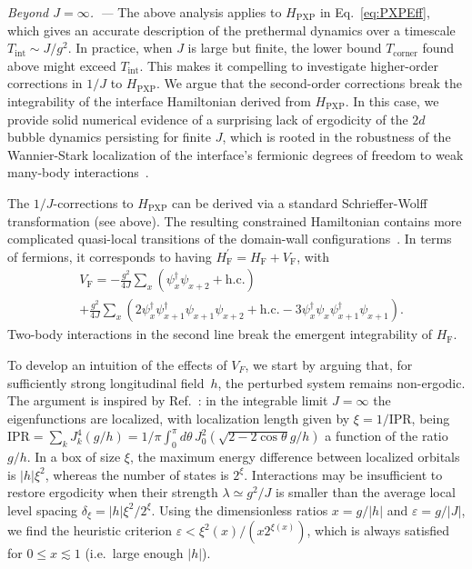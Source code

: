 \documentclass[reprint,aps,prl,superscriptaddress,english,nolongbibliography]{revtex4-2}
\begin{document}
\emph{Beyond $J=\infty$.~---} 
The above analysis applies to $H_{\mathrm{PXP}}$ in Eq.~\eqref{eq:PXPEff}, which gives an accurate description of the prethermal dynamics over a timescale $T_{\mathrm{int}}\sim J/g^2$. In practice, when $J$ is large but finite, the lower bound $T_{\text{corner}}$ found above might exceed $T_{\mathrm{int}}$. This makes it compelling to investigate higher-order corrections in $1/J$ to $H_{\mathrm{PXP}}$. We argue that the second-order corrections break the integrability of the interface Hamiltonian derived from $H_{\mathrm{PXP}}$. In this case, we provide solid numerical evidence of a surprising lack of ergodicity of the $2d$ bubble dynamics persisting for finite $J$, which is rooted in the robustness of the Wannier-Stark localization of the interface's fermionic degrees of freedom to weak many-body interactions~\cite{Refael2019From,Schulz2019Stark}.


The $1/J$-corrections to $H_{\mathrm{PXP}}$ can be derived via a standard Schrieffer-Wolff transformation (see above). The resulting constrained Hamiltonian contains more complicated quasi-local transitions of the domain-wall configurations~\cite{Balducci2022Interface}. In terms of fermions, it 
corresponds to having $H^{\prime}_{\mathrm{F}} = H_{\mathrm{F}} + V_{\mathrm{F}}$, with 
\begin{equation}
\begin{split}
    &V_{\mathrm{F}} = -\frac{g^2}{4J} \sum_x \left(\psi^\dagger_x \psi_{x+2}+ \mathrm{h.c.}\right) \\
    &+ \frac{g^2}{4J}\sum_x\left(2\psi^\dagger_x \psi^\dagger_{x+1} \psi_{x+1}\psi_{x+2}+ \mathrm{h.c.}-3\psi^\dagger_{x} \psi_{x}\psi^\dagger_{x+1} \psi_{x+1}\right).
\end{split}
\label{eq:JCorrect}
\end{equation}
Two-body interactions in the second line break the emergent integrability of $H_{\mathrm{F}}$. 


To develop an intuition of the effects of $V_F$, we start by arguing that, for sufficiently strong longitudinal field~$h$, the perturbed system remains non-ergodic. The argument is inspired by Ref.~\cite{Basko2006MetalInsulator}: in the integrable limit $J=\infty$ the eigenfunctions are localized, with localization length given by $\xi=1 / \mathrm{IPR}$, being $\mathrm{IPR}=\sum_k J_k^4(g / h) = 1 / \pi \int_0^{\pi} d\theta \, J_0^2( \sqrt{2-2\cos{\theta}} g/ h)$ a function of the ratio $g/h$. In a box of size $\xi$, the maximum energy difference between localized orbitals is $|h| \xi^2$, whereas the number of states is $2^{\xi}$. Interactions may be insufficient to restore ergodicity when their strength $\lambda \simeq g^2/J$ is smaller than the average local level spacing $\delta_{\xi}=|h| \xi^2/2^{\xi}$. Using the dimensionless ratios $x=g/|h|$ and $\varepsilon=g/|J|$, we find the heuristic criterion $\varepsilon < \xi^2(x)/(x 2^{\xi(x)})$, which is always satisfied for $0\le x \lesssim 1$ (i.e.\ large enough $|h|$).
\end{document}
